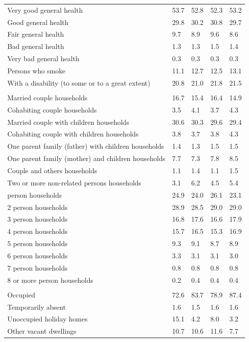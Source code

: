 \documentclass{article}
\begin{document}
\begin{table}[h]
\begin{tabular}{KTTTT}
    \hline
Very good general health & 53.7& 52.8&52.3& 53.2\\
Good general health & 29.8& 30.2& 30.8& 29.7\\
Fair general health & 9.7& 8.9&9.6& 8.6\\
Bad general health & 1.3& 1.3&1.5& 1.4\\
Very bad general health & 0.3& 0.3&0.3& 0.3\\
    \hline
Persons who smoke & 11.1& 12.7&12.5& 13.1\\
    \hline
With a disability (to some or to a great extent) & 20.8& 21.0&21.8& 21.5\\
\hline
    \\ 
    \hline
Married couple households & 16.7& 15.4& 16.4& 14.9\\
Cohabiting couple households & 3.5& 4.1& 3.7& 4.3\\
Married couple with children households & 30.6& 30.3& 29.6& 29.4\\
Cohabiting couple with children households & 3.8& 3.7& 3.8& 4.3\\
One parent family (father) with  children households & 1.4& 1.3& 1.5& 1.5\\
One parent family (mother) and children households & 7.7& 7.3& 7.8& 8.5\\
Couple and others households  & 1.1& 1.4& 1.1& 1.5\\
Two or more non-related persons households & 3.1& 6.2& 4.5& 5.4\\
     person households & 24.9& 24.0& 26.1& 23.1\\
2 person households & 28.9& 28.5& 29.0& 29.0\\
3 person households & 16.8& 17.6& 16.6& 17.9\\
4 person households & 15.7& 16.5& 15.3& 16.9\\
5 person households & 9.3& 9.1& 8.7& 8.9\\
6 person households & 3.3& 3.1& 3.1& 3.0\\
7 person households & 0.8& 0.8& 0.8& 0.8\\
8 or more person households & 0.2& 0.4& 0.4& 0.4\\
\hline
    \\ 
    \hline
Occupied & 72.6& 83.7& 78.9& 87.4\\
Temporarily absent & 1.6& 1.5& 1.6& 1.6\\
Unoccupied holiday homes & 15.1&  4.2&  8.0&  3.2\\
Other vacant dwellings & 10.7& 10.6& 11.6&  7.7\\
\hline
\end{tabular}
\end{table}
\end{document}
